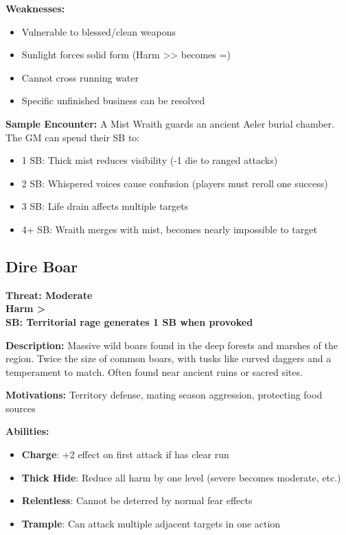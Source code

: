 \documentclass[12pt]{article}
\newcommand{\cp}[1]{\textbf{SB: #1}}
\newcommand{\harm}[1]{\textbf{Harm #1}}
\newcommand{\threat}[1]{\textbf{Threat: #1}}
\begin{document}
\textbf{Weaknesses:}
\begin{itemize}
\item Vulnerable to blessed/clean weapons
\item Sunlight forces solid form (Harm >> becomes =)
\item Cannot cross running water
\item Specific unfinished business can be resolved
\end{itemize}

\textbf{Sample Encounter:}
A Mist Wraith guards an ancient Aeler burial chamber. The GM can spend their SB to:
\begin{itemize}
\item 1 SB: Thick mist reduces visibility (-1 die to ranged attacks)
\item 2 SB: Whispered voices cause confusion (players must reroll one success)
\item 3 SB: Life drain affects multiple targets
\item 4+ SB: Wraith merges with mist, becomes nearly impossible to target
\end{itemize}

\subsection*{Dire Boar}

\threat{Moderate} \\
\harm{>} \\
\cp{Territorial rage generates 1 SB when provoked}

\vspace{0.5em}
\textbf{Description:} Massive wild boars found in the deep forests and marshes of the region. Twice the size of common boars, with tusks like curved daggers and a temperament to match. Often found near ancient ruins or sacred sites.

\textbf{Motivations:} Territory defense, mating season aggression, protecting food sources

\textbf{Abilities:}
\begin{itemize}
\item \textbf{Charge}: +2 effect on first attack if has clear run
\item \textbf{Thick Hide}: Reduce all harm by one level (severe becomes moderate, etc.)
\item \textbf{Relentless}: Cannot be deterred by normal fear effects
\item \textbf{Trample}: Can attack multiple adjacent targets in one action
\end{itemize}
\end{document}
